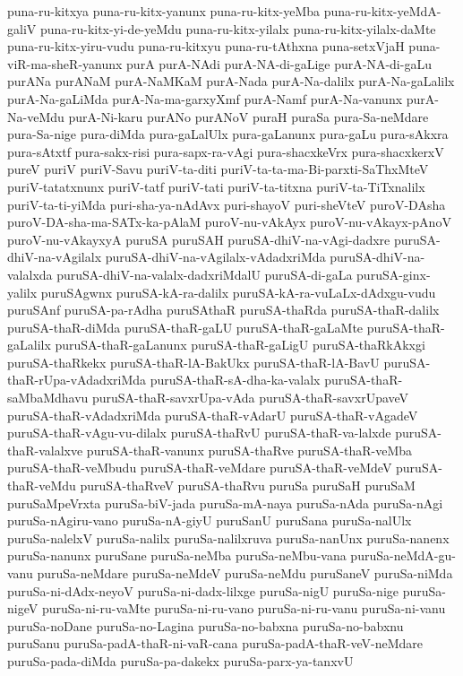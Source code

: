 {puna-ru-kitxya
puna-ru-kitx-yanunx
puna-ru-kitx-yeMba
puna-ru-kitx-yeMdA-galiV
puna-ru-kitx-yi-de-yeMdu
puna-ru-kitx-yilalx
puna-ru-kitx-yilalx-daMte
puna-ru-kitx-yiru-vudu
puna-ru-kitxyu
puna-ru-tAthxna
puna-setxVjaH
puna-viR-ma-sheR-yanunx
purA
purA-NAdi
purA-NA-di-gaLige
purA-NA-di-gaLu
purANa
purANaM
purA-NaMKaM
purA-Nada
purA-Na-dalilx
purA-Na-gaLalilx
purA-Na-gaLiMda
purA-Na-ma-garxyXmf
purA-Namf
purA-Na-vanunx
purA-Na-veMdu
purA-Ni-karu
purANo
purANoV
puraH
puraSa
pura-Sa-neMdare
pura-Sa-nige
pura-diMda
pura-gaLalUlx
pura-gaLanunx
pura-gaLu
pura-sAkxra
pura-sAtxtf
pura-sakx-risi
pura-sapx-ra-vAgi
pura-shacxkeVrx
pura-shacxkerxV
pureV
puriV
puriV-Savu
puriV-ta-diti
puriV-ta-ta-ma-Bi-parxti-SaThxMteV
puriV-tatatxnunx
puriV-tatf
puriV-tati
puriV-ta-titxna
puriV-ta-TiTxnalilx
puriV-ta-ti-yiMda
puri-sha-ya-nAdAvx
puri-shayoV
puri-sheVteV
puroV-DAsha
puroV-DA-sha-ma-SATx-ka-pAlaM
puroV-nu-vAkAyx
puroV-nu-vAkayx-pAnoV
puroV-nu-vAkayxyA
puruSA
puruSAH
puruSA-dhiV-na-vAgi-dadxre
puruSA-dhiV-na-vAgilalx
puruSA-dhiV-na-vAgilalx-vAdadxriMda
puruSA-dhiV-na-valalxda
puruSA-dhiV-na-valalx-dadxriMdalU
puruSA-di-gaLa
puruSA-ginx-yalilx
puruSAgwnx
puruSA-kA-ra-dalilx
puruSA-kA-ra-vuLaLx-dAdxgu-vudu
puruSAnf
puruSA-pa-rAdha
puruSAthaR
puruSA-thaRda
puruSA-thaR-dalilx
puruSA-thaR-diMda
puruSA-thaR-gaLU
puruSA-thaR-gaLaMte
puruSA-thaR-gaLalilx
puruSA-thaR-gaLanunx
puruSA-thaR-gaLigU
puruSA-thaRkAkxgi
puruSA-thaRkekx
puruSA-thaR-lA-BakUkx
puruSA-thaR-lA-BavU
puruSA-thaR-rUpa-vAdadxriMda
puruSA-thaR-sA-dha-ka-valalx
puruSA-thaR-saMbaMdhavu
puruSA-thaR-savxrUpa-vAda
puruSA-thaR-savxrUpaveV
puruSA-thaR-vAdadxriMda
puruSA-thaR-vAdarU
puruSA-thaR-vAgadeV
puruSA-thaR-vAgu-vu-dilalx
puruSA-thaRvU
puruSA-thaR-va-lalxde
puruSA-thaR-valalxve
puruSA-thaR-vanunx
puruSA-thaRve
puruSA-thaR-veMba
puruSA-thaR-veMbudu
puruSA-thaR-veMdare
puruSA-thaR-veMdeV
puruSA-thaR-veMdu
puruSA-thaRveV
puruSA-thaRvu
puruSa
puruSaH
puruSaM
puruSaMpeVrxta
puruSa-biV-jada
puruSa-mA-naya
puruSa-nAda
puruSa-nAgi
puruSa-nAgiru-vano
puruSa-nA-giyU
puruSanU
puruSana
puruSa-nalUlx
puruSa-nalelxV
puruSa-nalilx
puruSa-nalilxruva
puruSa-nanUnx
puruSa-nanenx
puruSa-nanunx
puruSane
puruSa-neMba
puruSa-neMbu-vana
puruSa-neMdA-gu-vanu
puruSa-neMdare
puruSa-neMdeV
puruSa-neMdu
puruSaneV
puruSa-niMda
puruSa-ni-dAdx-neyoV
puruSa-ni-dadx-lilxge
puruSa-nigU
puruSa-nige
puruSa-nigeV
puruSa-ni-ru-vaMte
puruSa-ni-ru-vano
puruSa-ni-ru-vanu
puruSa-ni-vanu
puruSa-noDane
puruSa-no-Lagina
puruSa-no-babxna
puruSa-no-babxnu
puruSanu
puruSa-padA-thaR-ni-vaR-cana
puruSa-padA-thaR-veV-neMdare
puruSa-pada-diMda
puruSa-pa-dakekx
puruSa-parx-ya-tanxvU
}
